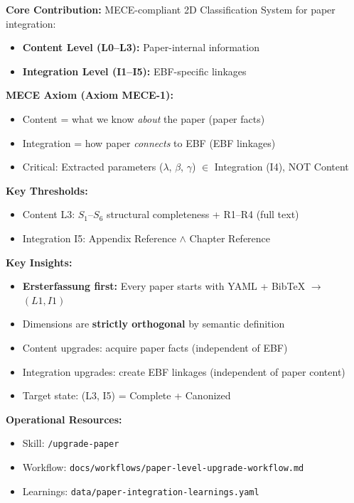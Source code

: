 \begin{tcolorbox}[colback=gray!5!white, colframe=gray!75!black,
    title=Appendix BM Summary: METHOD-PAPERINT (MECE-Compliant)]

\textbf{Core Contribution:}
MECE-compliant 2D Classification System for paper integration:
\begin{itemize}[nosep]
    \item \textbf{Content Level (L0--L3):} Paper-internal information
    \item \textbf{Integration Level (I1--I5):} EBF-specific linkages
\end{itemize}

\textbf{MECE Axiom (Axiom MECE-1):}
\begin{itemize}[nosep]
    \item Content = what we know \textit{about} the paper (paper facts)
    \item Integration = how paper \textit{connects} to EBF (EBF linkages)
    \item Critical: Extracted parameters ($\lambda$, $\beta$, $\gamma$) $\in$ Integration (I4), NOT Content
\end{itemize}

\textbf{Key Thresholds:}
\begin{itemize}[nosep]
    \item Content L3: $S_1$--$S_6$ structural completeness + R1--R4 (full text)
    \item Integration I5: Appendix Reference $\land$ Chapter Reference
\end{itemize}

\textbf{Key Insights:}
\begin{itemize}[nosep]
    \item \textbf{Ersterfassung first:} Every paper starts with YAML + BibTeX $\rightarrow$ $(L1, I1)$
    \item Dimensions are \textbf{strictly orthogonal} by semantic definition
    \item Content upgrades: acquire paper facts (independent of EBF)
    \item Integration upgrades: create EBF linkages (independent of paper content)
    \item Target state: (L3, I5) = Complete + Canonized
\end{itemize}

\textbf{Operational Resources:}
\begin{itemize}[nosep]
    \item Skill: \texttt{/upgrade-paper}
    \item Workflow: \texttt{docs/workflows/paper-level-upgrade-workflow.md}
    \item Learnings: \texttt{data/paper-integration-learnings.yaml}
\end{itemize}

\end{tcolorbox}

